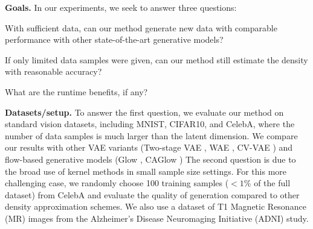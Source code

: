 \textbf{Goals.} In our experiments, we seek to answer three questions: 
\begin{inparaenum}[\bfseries (a)] \label{first}
\item With sufficient data, can our method generate new data with comparable performance with other state-of-the-art generative models?
\item If only limited data samples were given, can our method still estimate the density with reasonable accuracy?
\item What are the runtime benefits, if any?
\end{inparaenum}

\textbf{Datasets/setup.} To answer the first question, we evaluate our method on standard vision datasets, including MNIST, CIFAR10, and CelebA, where the number of data samples is much larger than the latent dimension. We compare our results with other VAE variants (Two-stage VAE \citep{dai2018diagnosing}, WAE \citep{arjovsky2017wasserstein}, CV-VAE \citep{Ghosh2020From}) and flow-based generative models (Glow \citep{Kingma2018Glow}, CAGlow \citep{Liu2019CAflow})
The second question is due to 
the broad use of kernel methods in small sample size settings. For this more challenging case, we randomly choose 100 training samples ($<1$\% of the full dataset) from CelebA and evaluate the quality of generation compared to other density approximation schemes. We also use a dataset of T1 Magnetic Resonance (MR) images from the Alzheimer's Disease Neuromaging Initiative (ADNI) study. 





